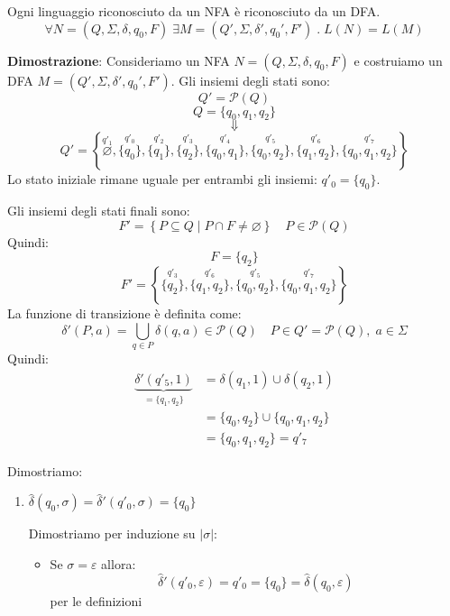 \documentclass[a4paper]{article}
\begin{document}
\begin{theorem}
  Ogni linguaggio riconosciuto da un NFA è riconosciuto da un DFA.
  \[
    \forall N = (Q, \Sigma, \delta, q_0, F) \; \exists M = (Q', \Sigma, \delta', q_0', F') \;.\;
    L(N) = L(M)
  \] 

  \vspace{1em}
  \noindent
  \textbf{Dimostrazione}: Consideriamo un NFA \( N = (Q, \Sigma, \delta, q_0, F) \) e
  costruiamo un DFA \( M = (Q', \Sigma, \delta', q_0', F') \).
  Gli insiemi degli stati sono:
  \[
    Q' = \mathcal{P}(Q)
  \] 
  \[
   Q = \{q_0, q_1, q_2\}
  \] 
  \[
    \Downarrow
  \] 
  \[
    Q' = \left\{ 
      \stackrel{q'_1}{\varnothing}, \stackrel{q'_0}{\{q_0\}}, \stackrel{q'_2}{\{q_1\}},
      \stackrel{q'_3}{\{q_2\}}, \stackrel{q'_4}{\{q_0, q_1\}}, \stackrel{q'_5}{\{q_0, q_2\}},
      \stackrel{q'_6}{\{q_1, q_2\}}, \stackrel{q'_7}{\{q_0, q_1, q_2\}}
    \right\}
  \] 
  Lo stato iniziale rimane uguale per entrambi gli insiemi: \( q'_0 = \{q_0\}  \).

  Gli insiemi degli stati finali sono:
  \[
    F' = \left\{ P \subseteq Q \;\left|\; P \cap F \neq \varnothing \right. \right\} \quad
    P \in \mathcal{P}(Q)
  \] 
  Quindi:
  \[
    F = \{q_2\} 
  \] 
  \[
    F' = \left\{ \stackrel{q'_3}{\{q_2\}}, \stackrel{q'_6}{\{q_1, q_2\}},
      \stackrel{q'_5}{\{q_0, q_2\}}, \stackrel{q'_7}{\{q_0, q_1, q_2\}}
    \right\}
  \] 
  La funzione di transizione è definita come:
  \[
    \delta'(P, a) = \bigcup_{q \in P} \delta(q, a) \in \mathcal{P}(Q) \quad P \in Q' = \mathcal{P}(Q),\; a \in \Sigma 
  \]
  Quindi:
  \[
    \begin{aligned}
      \underbrace{\delta'(q'_5, 1)}_{= \{q_1, q_2\} }
      &= \delta(q_1, 1) \cup \delta(q_2, 1)\\
                       &= \{q_0, q_2\} \cup \{q_0, q_1, q_2\}\\
                       &= \{q_0, q_1, q_2\} = q'_7
    \end{aligned}
  \] 

  \vspace{1em}
  \noindent
  Dimostriamo: 
  \begin{enumerate}
    \item 
      \( \hat{\delta}(q_0, \sigma) = \hat{\delta}'(q'_0, \sigma) = \{q_0\}  \) 

      \vspace{1em}
      \noindent
      Dimostriamo per induzione su \( \left| \sigma  \right|  \):

      \begin{itemize}
        \item 
          Se \( \sigma = \varepsilon \) allora:
          \[
            \hat{\delta}'(q'_0, \varepsilon) = q'_0 = \{q_0\} = \hat{\delta}(q_0, \varepsilon)
          \] 
          per le definizioni


\end{itemize}
\end{enumerate}
\end{theorem}
\end{document}
